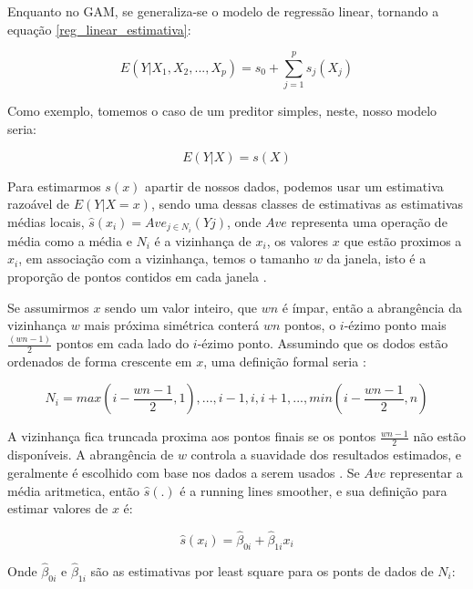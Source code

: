 \documentclass[
	12pt,				%
	openright,			%
	oneside,			%
	a4paper,			%
	english,			%
	brazil				%
	]{abntex2}
\begin{document}
Enquanto no GAM, se generaliza-se o modelo de regressão linear, tornando a equação \ref{reg_linear_estimativa}:

\begin{equation}
	\label{reg_linear_generalizada}
	E(Y|X_1,X_2,...,X_p) = s_0 + \sum_{j=1}^{p} s_j(X_j)
\end{equation}

Como exemplo, tomemos o caso de um preditor simples, neste, nosso modelo seria:

\begin{equation}
	\label{preditor_simples}
	E(Y|X) = s(X)
\end{equation}

Para estimarmos $s(x)$ apartir de nossos dados, podemos usar um estimativa razoável de $E(Y|X=x)$, sendo uma dessas 
classes de estimativas as estimativas médias locais, $\hat{s}(x_i) = Ave_{j \in N_i}(Yj)$, onde $Ave$ representa uma
operação de média como a média e $N_i$ é a vizinhança de $x_i$, os valores $x$ que estão proximos a $x_i$, em
associação com a vizinhança, temos o tamanho $w$ da janela, isto é a proporção de pontos contidos em cada janela \cite{GAM}.

Se assumirmos $x$ sendo um valor inteiro, que $wn$ é ímpar, então a abrangência da vizinhança $w$ mais próxima simétrica conterá
$wn$ pontos, o $i$-ézimo ponto mais $\frac{(wn - 1)}{2}$ pontos em cada lado do $i$-ézimo ponto. Assumindo que os dodos
estão ordenados de forma crescente em $x$, uma definição formal seria \cite{GAM}:

\begin{equation}
	\label{eq_vizinhanaça}
	N_i = {max(i-\frac{wn-1}{2},1),...,i-1,i,i+1,...,min(i-\frac{wn-1}{2},n)}
\end{equation}

A vizinhança fica truncada proxima aos pontos finais se os pontos $\frac{wn-1}{2}$ não estão disponíveis. A abrangência de $w$
controla a suavidade dos resultados estimados, e geralmente é escolhido com base nos dados a serem usados \cite{GAM}. Se
$Ave$ representar a média aritmetica, então $\hat{s}(.)$ é a running lines smoother, e sua definição para estimar valores
de $x$ é:

\begin{equation}
	\label{running_lines_smoother}
	\hat{s}(x_i) = \hat{\beta}_{0i} + \hat{\beta}_{1i}x_i
\end{equation}

Onde $\hat{\beta}_{0i}$ e $\hat{\beta}_{1i}$ são as estimativas por least square para os ponts de dados de $N_i$:
\end{document}
